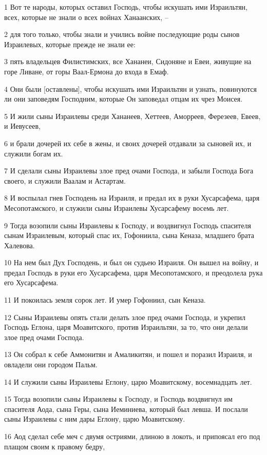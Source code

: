 \par 1 Вот те народы, которых оставил Господь, чтобы искушать ими Израильтян, всех, которые не знали о всех войнах Ханаанских, --
\par 2 для того только, чтобы знали и учились войне последующие роды сынов Израилевых, которые прежде не знали ее:
\par 3 пять владельцев Филистимских, все Хананеи, Сидоняне и Евеи, живущие на горе Ливане, от горы Ваал-Ермона до входа в Емаф.
\par 4 Они были [оставлены], чтобы искушать ими Израильтян и узнать, повинуются ли они заповедям Господним, которые Он заповедал отцам их чрез Моисея.
\par 5 И жили сыны Израилевы среди Хананеев, Хеттеев, Аморреев, Ферезеев, Евеев, и Иевусеев,
\par 6 и брали дочерей их себе в жены, и своих дочерей отдавали за сыновей их, и служили богам их.
\par 7 И сделали сыны Израилевы злое пред очами Господа, и забыли Господа Бога своего, и служили Ваалам и Астартам.
\par 8 И воспылал гнев Господень на Израиля, и предал их в руки Хусарсафема, царя Месопотамского, и служили сыны Израилевы Хусарсафему восемь лет.
\par 9 Тогда возопили сыны Израилевы к Господу, и воздвигнул Господь спасителя сынам Израилевым, который спас их, Гофониила, сына Кеназа, младшего брата Халевова.
\par 10 На нем был Дух Господень, и был он судьею Израиля. Он вышел на войну, и предал Господь в руки его Хусарсафема, царя Месопотамского, и преодолела рука его Хусарсафема.
\par 11 И покоилась земля сорок лет. И умер Гофониил, сын Кеназа.
\par 12 Сыны Израилевы опять стали делать злое пред очами Господа, и укрепил Господь Еглона, царя Моавитского, против Израильтян, за то, что они делали злое пред очами Господа.
\par 13 Он собрал к себе Аммонитян и Амаликитян, и пошел и поразил Израиля, и овладели они городом Пальм.
\par 14 И служили сыны Израилевы Еглону, царю Моавитскому, восемнадцать лет.
\par 15 Тогда возопили сыны Израилевы к Господу, и Господь воздвигнул им спасителя Аода, сына Геры, сына Иеминиева, который был левша. И послали сыны Израилевы с ним дары Еглону, царю Моавитскому.
\par 16 Аод сделал себе меч с двумя остриями, длиною в локоть, и припоясал его под плащом своим к правому бедру,
